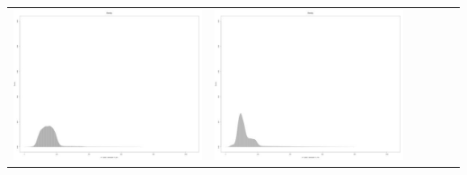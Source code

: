 \begin{table}[htbp]
{\begin{tabular}{l | ccccc}
\begin{minipage}{.15\textwidth}
     			 	\includegraphics[width=\linewidth]{images/mema-dens-graph/I8}
    				 \end{minipage}
    			   &	 \begin{minipage}{.15\textwidth}
     			 	\includegraphics[width=\linewidth]{images/mema-dens-graph/I11}
    				 \end{minipage}
    			   &	 \begin{minipage}{.15\textwidth}

\end{minipage}
\end{tabular}}
\end{table}
